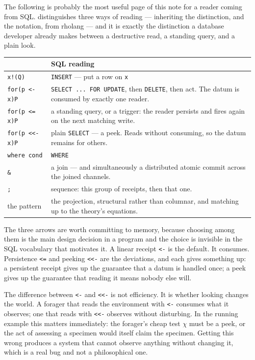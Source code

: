 The following is probably the most useful page of this note for a reader coming
from SQL. \flang{} distinguishes three ways of reading --- inheriting the
distinction, and the notation, from rholang --- and it is exactly the
distinction a database developer already makes between a destructive read, a
standing query, and a plain look.

\begin{center}
\small
\begin{tabular}{@{}L{0.36\textwidth}L{0.56\textwidth}@{}}
\toprule
\textbf{\flang{}} & \textbf{SQL reading} \\
\midrule
\texttt{x!(Q)} &
\texttt{INSERT} --- put a row on \texttt{x} \\[3pt]
\texttt{for(p <- x)P} &
\texttt{SELECT ... FOR UPDATE}, then \texttt{DELETE}, then act. The datum is
consumed by exactly one reader. \\[3pt]
\texttt{for(p <= x)P} &
a standing query, or a trigger: the reader persists and fires again on the
next matching write. \\[3pt]
\texttt{for(p <<- x)P} &
plain \texttt{SELECT} --- a peek. Reads without consuming, so the datum remains
for others. \\[3pt]
\texttt{where cond} &
\texttt{WHERE} \\[3pt]
\texttt{\&} &
a join --- and simultaneously a distributed atomic commit across the joined
channels. \\[3pt]
\texttt{;} &
sequence: this group of receipts, then that one. \\[3pt]
the pattern &
the projection, structural rather than columnar, and matching up to the
theory's equations. \\
\bottomrule
\end{tabular}
\end{center}

The three arrows are worth committing to memory, because choosing among them is
the main design decision in a \flang{} program and the choice is invisible in the
SQL vocabulary that motivates it. A linear receipt \texttt{<-} is the default.
It consumes. Persistence \texttt{<=} and peeking \texttt{<<-} are the deviations,
and each gives something up: a persistent receipt gives up the guarantee that a
datum is handled once; a peek gives up the guarantee that reading it means
nobody else will.

\begin{remark}
\label{rem:peek}
The difference between \texttt{<-} and \texttt{<<-} is not efficiency. It is
whether looking changes the world. A forager that reads the environment with
\texttt{<-} consumes what it observes; one that reads with \texttt{<<-} observes
without disturbing. In the running example this matters immediately: the
forager's cheap test $\chi$ must be a peek, or the act of assessing a specimen
would itself claim the specimen. Getting this wrong produces a system that
cannot observe anything without changing it, which is a real bug and not a
philosophical one.
\end{remark}

